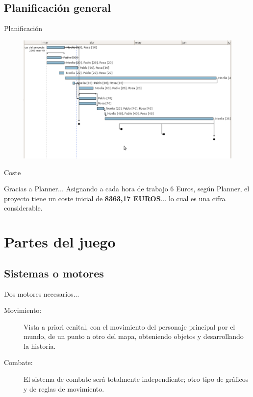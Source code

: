 \documentclass[9pt,xcolor=svgnames]{beamer}
\begin{document}
  \subsection{Planificación general}

  \begin{frame}{Planificación}
   \transdissolve
   
   \begin{figure}[t]
    \includegraphics[scale=0.27]{./Imagenes/gannt.pdf}
   \end{figure}
  \end{frame}

  \begin{frame}{Coste}
    \transdissolve
    \begin{block}{Gracias a Planner...}
      \noindent Asignando a cada hora de trabajo 6 Euros, según
      Planner, el proyecto tiene un coste inicial de \textbf{8363,17
        EUROS}... lo cual es una cifra considerable.
    \end{block}
  \end{frame}
  

 \section{Partes del juego}
 
  \subsection{Sistemas o motores}
  
  \begin{frame}{Dos motores necesarios...}
   \transdissolve
   
   \begin{description}
    \item[Movimiento: ] Vista a priori cenital, con el movimiento del
	       personaje principal por el mundo, de un punto a otro del
	       mapa, obteniendo objetos y desarrollando la historia.
    \item[Combate: ] El sistema de combate será totalmente
	       independiente; otro tipo de gráficos y de reglas de
	       movimiento.
   \end{description}
   
  \end{frame}
  
\end{document}
